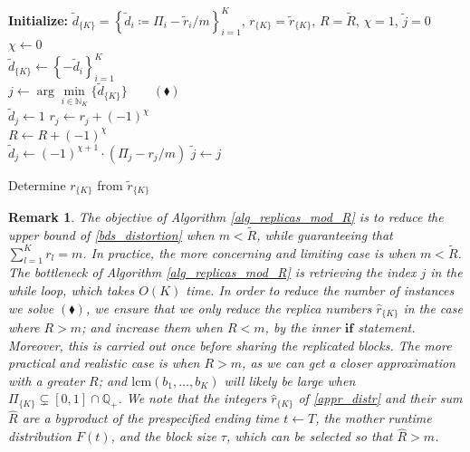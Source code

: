 \documentclass[journal,letterpaper,onecolumn,twoside,nofonttune]{IEEEtran}
\newcommand{\N}{\mathbb{N}}
\newcommand{\Q}{\mathbb{Q}}
\newcommand{\dt}{\tilde{d}}
\newcommand{\Rh}{\hat{R}}
\newcommand{\Rt}{\tilde{R}}
\newcommand{\rh}{\hat{r}}
\newcommand{\rt}{\tilde{r}}
\newcommand{\lcm}{\mathrm{lcm}}
\newtheorem{Rmk}{Remark}
\begin{document}
\begin{algorithm}[h]
\SetAlgoLined
{\small%
  \KwIn{$m$, $\Pi_{\{K\}}$, $\rt_{\{K\}}$, $\Rt=\sum_{i=1}^K\rt_i$}
  \textbf{Initialize:} $\dt_{\{K\}}=\left\{\dt_i\coloneqq\Pi_i-\rt_i/m\right\}_{i=1}^K$, $r_{\{K\}}=\rt_{\{K\}}$, $R=\Rt$, $\chi=1$, $\tilde{j}=0$\\%
    {
      $\chi\gets 0$ \Comment{$\rhd \ \chi$ indicates: $\Rt\geqslant m$ or $\Rt<m$}\\
      $\dt_{\{K\}}\gets \left\{-\dt_i\right\}_{i=1}^K$\\
    }
    {
      $j\gets \arg\min\limits_{i\in\N_K}\big\{\dt_{\{K\}}\big\} \qquad (\blacklozenge)$\\
          {
            $\dt_j\gets 1$
          }
        \Else
          {
            $r_j\gets r_j+(-1)^{\chi}$\\
            $R\gets R+(-1)^{\chi}$\\
            $\dt_j\gets(-1)^{\chi+1}\cdot\left(\Pi_j-r_j/m\right)$
          }
       $\tilde{j}\gets j$
    }
}
\caption{Determine $r_{\{K\}}$ from $\rt_{\{K\}}$}
\label{alg_replicas_mod_R}  %
\end{algorithm}

\begin{Rmk}
\label{rmk_repl_nums}
The objective of Algorithm \ref{alg_replicas_mod_R} is to reduce the upper bound of \eqref{bds_distortion} when $m<\Rt$, while guaranteeing that $\sum_{l=1}^Kr_l=m$. In practice, the more concerning and limiting case is when $m<\Rt$. The bottleneck of Algorithm \ref{alg_replicas_mod_R} is retrieving the index $j$ in the while loop, which takes $O(K)$ time. In order to reduce the number of instances we solve $(\blacklozenge)$, we ensure that we only reduce the replica numbers $\rh_{\{K\}}$ in the case where $R>m$; and increase them when $R<m$, by the inner $\textbf{if}$ statement. Moreover, this is carried out once before sharing the replicated blocks. The more practical and realistic case is when $R>m$, as we can get a closer approximation with a greater $R$; and $\lcm(b_1,\ldots,b_K)$ will likely be large when $\Pi_{\{K\}}\subsetneq[0,1]\cap\Q_+$. We note that the integers $\rh_{\{K\}}$ of \eqref{appr_distr} and their sum $\Rh$ are a byproduct of the prespecified ending time $t\gets T$, the mother runtime distribution $F(t)$, and the block size $\tau$, which can be selected so that $\Rh>m$.%
\end{Rmk}
\end{document}
